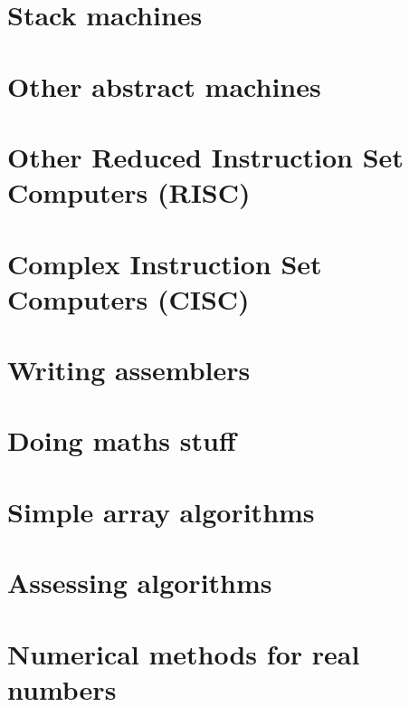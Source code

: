 \documentclass[oneside]{book}
\begin{document}
\part{Stack machines}



\part{Other abstract machines}


\part{Other Reduced Instruction Set Computers (RISC)}






\part{Complex Instruction Set Computers (CISC)}







\part{Writing assemblers}


\part{Doing maths stuff}




\part{Simple array algorithms}






\part{Assessing algorithms}



\part{Numerical methods for real numbers}






\end{document}
